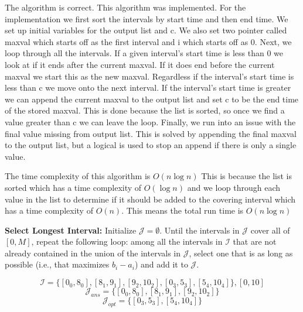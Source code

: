 \documentclass{hw}
\begin{document}
\begin{problem}
        \begin{solution}
            The algorithm is correct. This algorithm was implemented. For the implementation we first sort the intervals by start time and then end time. We set up initial variables for the output list and c. We also set two pointer called max\textunderscore val which starts off as the first interval and i which starts off as 0. Next, we loop through all the intervals. If a given interval's start time is less than 0 we look at if it ends after the current max\textunderscore val. If it does end before the current max\textunderscore val we start this as the new max\textunderscore val. Regardless if the interval's start time is less than c we move onto the next interval. If the interval's start time is greater we can append the current max\textunderscore val to the output list and set c to be the end time of the stored max\textunderscore val. This is done because the list is sorted, so once we find a value greater than c we can leave the loop. Finally, we run into an issue with the final value missing from output list. This is solved by appending the final max\textunderscore val to the output list, but a logical is used to stop an append if there is only a single value.
    
            The time complexity of this algorithm is $O(n \log n)$ This is because the list is sorted which has a time complexity of $O(\log n)$ and we loop through each value in the list to determine if it should be added to the covering interval which has a time complexity of $O(n)$. This means the total run time is $O(n \log n)$
        \end{solution}
    
        \begin{subproblem}
            \textbf{Select Longest Interval:} Initialize $\mathcal{J}=\emptyset$. Until the intervals in $\mathcal{J}$ cover all of $[0,M]$, repeat the following loop: among all the intervals in $\mathcal{I}$ that are not already contained in the union of the intervals in $\mathcal{J}$, select one that is as long as possible (i.e., that maximizes $b_i-a_i$) and add it to $\mathcal{J}$.
        \end{subproblem}

        \begin{solution}
            $$
            \mathcal{I} = \{[0_0,8_0], [8_1,9_1], [9_2,10_2], [0_3,5_3], [5_4,10_4]\}, [0,10]
            $$
            $$
            \mathcal{J}_{ans} = \{[0_0,8_0], [8_1,9_1], [9_2,10_2]\}
            $$
            $$
            \mathcal{J}_{opt} = \{[0_3,5_3], [5_4,10_4]\}
            $$
        \end{solution}


\end{problem}
\end{document}
